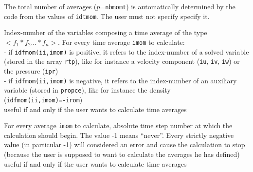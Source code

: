 The total number of averages ($p$={\tt nbmomt}) is automatically determined by
the code from the values of {\tt idtmom}. The user must not specify specify it.

{Index-number of the variables composing a time average of the type
$<f_1*f_2...*f_n>$. For every time average {\tt imom} to calculate:\\
\hspace*{1.3cm} - if {\tt idfmom(ii,imom)} is positive, it refers to the
                  index-number of a solved variable (stored in the array
                  {\tt rtp}), like for instance a velocity component
                  ({\tt iu}, {\tt iv}, {\tt iw})
                  or the pressure ({\tt ipr})\\
\hspace*{1.3cm} - if {\tt idfmom(ii,imom)} is negative, it refers to the
                  index-number of an auxiliary variable (stored in
                  {\tt propce}), like for instance the density\\
                  ({\tt idfmom(ii,imom)=-irom})\\
useful if and only if the user wants to calculate time averages}

{For every average {\tt imom} to calculate, absolute time step number at which
the calculation should begin. The value -1 means ``never''. Every
strictly negative value (in particular -1) will considered an error and
cause the calculation to stop (because the user is supposed to want to
calculate the averages he has defined)\\
useful if and only if the user wants to calculate time averages}

